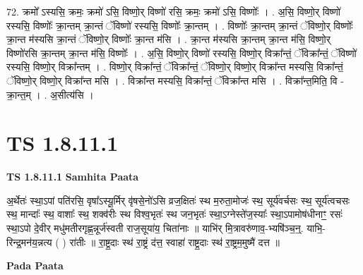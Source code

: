 \documentclass[17pt]{extarticle}
\begin{document}
72. क्रमो᳚ ऽस्यसि॒ क्रमः॒ क्रमो॑ ऽसि॒ विष्णो॒र् विष्णो॑ रसि॒ क्रमः॒ क्रमो॑ ऽसि॒ विष्णोः᳚ । . अ॒सि॒ विष्णो॒र् विष्णो॑ रस्यसि॒ विष्णोः᳚ क्रा॒न्तम् क्रा॒न्तं ॅविष्णो॑ रस्यसि॒ विष्णोः᳚ क्रा॒न्तम् । . विष्णोः᳚ क्रा॒न्तम् क्रा॒न्तं ॅविष्णो॒र् विष्णोः᳚ क्रा॒न्त म॑स्यसि क्रा॒न्तं ॅविष्णो॒र् विष्णोः᳚ क्रा॒न्त म॑सि । . क्रा॒न्त म॑स्यसि क्रा॒न्तम् क्रा॒न्त म॑सि॒ विष्णो॒र् विष्णो॑रसि क्रा॒न्तम् क्रा॒न्त म॑सि॒ विष्णोः᳚ । . अ॒सि॒ विष्णो॒र् विष्णो॑ रस्यसि॒ विष्णो॒र् विक्रा᳚न्तं॒ ॅविक्रा᳚न्तं॒ ॅविष्णो॑ रस्यसि॒ विष्णो॒र् विक्रा᳚न्तम् । . विष्णो॒र् विक्रा᳚न्तं॒ ॅविक्रा᳚न्तं॒ ॅविष्णो॒र् विष्णो॒र् विक्रा᳚न्त मस्यसि॒ विक्रा᳚न्तं॒ ॅविष्णो॒र् विष्णो॒र् विक्रा᳚न्त मसि । . विक्रा᳚न्त मस्यसि॒ विक्रा᳚न्तं॒ ॅविक्रा᳚न्त मसि । . विक्रा᳚न्त॒मिति॒ वि - क्रा॒न्त॒म् । . अ॒सीत्य॑सि । \newline
\pagebreak
{}
\section*{ TS 1.8.11.1 }

\textbf{TS 1.8.11.1 } \newline
\textbf{Samhita Paata} \newline

अ॒र्थेतः॑ स्था॒ऽपां पति॑रसि॒ वृषा᳚ऽस्यू॒र्मिर् वृ॑षसे॒नो॑ऽसि व्रज॒क्षितः॑ स्थ म॒रुता॒मोजः॑ स्थ॒ सूर्य॑वर्चसः स्थ॒ सूर्य॑त्वचसः स्थ॒ मान्दाः᳚ स्थ॒ वाशाः᳚ स्थ॒ शक्व॑रीः स्थ विश्व॒भृतः॑ स्थ जन॒भृतः॑ स्था॒ऽग्नेस्ते॑ज॒स्याः᳚ स्था॒ऽपामोष॑धीनाꣳ॒॒ रसः॑ स्था॒ऽपो दे॒वीर् मधु॑मतीरगृह्ण॒न्नूर्ज॑स्वती राज॒सूया॑य॒ चिता॑नाः ॥ याभि॑र् मि॒त्रावरु॑णाव॒-भ्यषि॑ञ्च॒न्॒. याभि॒-रिन्द्र॒मन॑य॒न्नत्य ( ) रा॑तीः ॥ रा॒ष्ट्र॒दाः स्थ॑ रा॒ष्ट्रं द॑त्त॒ स्वाहा॑ राष्ट्र॒दाः स्थ॑ रा॒ष्ट्रम॒मुष्मै॑ दत्त ॥ \newline

\textbf{Pada Paata} \newline
\end{document}
